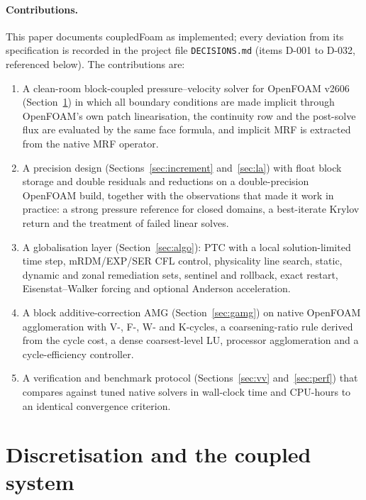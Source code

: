 \documentclass[11pt,a4paper]{article}
\newcommand{\code}[1]{\texttt{#1}}
\begin{document}
\paragraph{Contributions.} This paper documents coupledFoam as implemented;
every deviation from its specification is recorded in the project file
\code{DECISIONS.md} (items D-001 to D-032, referenced below). The
contributions are:
\begin{enumerate}
\item A clean-room block-coupled pressure--velocity solver for OpenFOAM v2606
  (Section~\ref{sec:disc}) in which all boundary conditions are made implicit
  through OpenFOAM's own patch linearisation, the continuity row and the
  post-solve flux are evaluated by the same face formula, and implicit MRF
  is extracted from the native MRF operator.
\item A precision design (Sections~\ref{sec:increment} and~\ref{sec:la})
  with float block storage and double residuals and reductions on a
  double-precision OpenFOAM build, together with the observations that made
  it work in practice: a strong pressure reference for closed domains, a
  best-iterate Krylov return and the treatment of failed linear solves.
\item A globalisation layer (Section~\ref{sec:algo}): PTC with a local
  solution-limited time step, mRDM/EXP/SER CFL control, physicality line
  search, static, dynamic and zonal remediation sets, sentinel and rollback,
  exact restart, Eisenstat--Walker forcing and optional Anderson acceleration.
\item A block additive-correction AMG (Section~\ref{sec:gamg}) on native
  OpenFOAM agglomeration with V-, F-, W- and K-cycles, a coarsening-ratio
  rule derived from the cycle cost, a dense coarsest-level LU, processor
  agglomeration and a cycle-efficiency controller.
\item A verification and benchmark protocol (Sections~\ref{sec:vv}
  and~\ref{sec:perf}) that compares against tuned native solvers in
  wall-clock time and CPU-hours to an identical convergence criterion.
\end{enumerate}

\section{Discretisation and the coupled system}\label{sec:disc}
\end{document}
